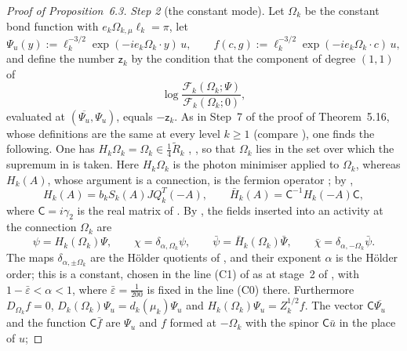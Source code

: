 \documentclass[11pt,letterpaper,reqno]{amsart}
\theoremstyle{definition}
\begin{document}
\begin{proof}[Proof of Proposition~6.3]
\emph{Step 2} (the constant mode).
Let $\Omega_k$ be the constant bond function with $e_k\Omega_{k,\mu}\ell_k=\pi$, let
\begin{equation*}
\Psi_u(y):=\ell_k^{-3/2}\exp(-ie_k\Omega_k\cdot y)\,u,\qquad f(c,g):=\ell_k^{-3/2}\exp(-ie_k\Omega_k\cdot c)\,u,
\end{equation*}
and define the number $\mathsf z_k$ by the condition that the component of degree $(1,1)$ of
\begin{equation*}
\log\frac{\mathscr F_k(\Omega_k;\Psi)}{\mathscr F_k(\Omega_k;0)},
\end{equation*}
evaluated at $(\overline{\Psi_u},\Psi_u)$, equals $-\mathsf z_k$.
As in Step~7 of the proof of Theorem~5.16, whose definitions \cite[(I.O8); Sections~I.3.2, I.3.3, I.3.5]{QEDIII} are the same at every level $k\ge1$ (compare \cite[Proposition~30.3\,(f)]{QEDIII}), one finds the following.
One has $H_k\Omega_k=\Omega_k\in\frac14\tilde R_k$ \cite[Propositions~5.31, 5.38\,(i)]{QEDI}, \cite[Section~I.5.7, paragraph ``Settings'']{QEDIII}, so that $\Omega_k$ lies in the set over which the supremum in \cite[(k6)]{QEDIII} is taken.
Here $H_k\Omega_k$ is the photon minimiser applied to $\Omega_k$, whereas $H_k(A)$, whose argument is a connection, is the fermion operator \cite[Section~I.5.7, first paragraph]{QEDIII};
by \cite[Section~I.3.5]{QEDIII},
\begin{equation*}
H_k(A)=b_kS_k(A)JQ_k^T(-A),\qquad\bar H_k(A)=\mathsf C^{-1}H_k(-A)\mathsf C,
\end{equation*}
where $\mathsf C=i\gamma_2$ is the real matrix of \cite[Section~I.2.1, (I.c3)]{QEDIII}.
By \cite[Section~I.5.4, paragraph ``Fields to be inserted'']{QEDIII}, the fields inserted into an activity at the connection $\Omega_k$ are
\begin{equation*}
\psi=H_k(\Omega_k)\Psi,\qquad\chi=\delta_{\alpha,\Omega_k}\psi,\qquad\bar\psi=\bar H_k(\Omega_k)\bar\Psi,\qquad\bar\chi=\delta_{\alpha,-\Omega_k}\bar\psi .
\end{equation*}
The maps $\delta_{\alpha,\pm\Omega_k}$ are the H\"older quotients of \cite[(I.1.7)]{QEDIII}, and their exponent $\alpha$ is the H\"older order;
this is a constant, chosen in the line (C1) of \cite[Section~I.8.2]{QEDIII} as at stage~2 of \cite[Definition~5.97]{QEDI}, with $1-\bar\varepsilon<\alpha<1$, where $\bar\varepsilon=\frac1{200}$ is fixed in the line (C0) there.
Furthermore $D_{\Omega_k}f=0$, $D_k(\Omega_k)\Psi_u=d_k(\mu_k)\Psi_u$ and $H_k(\Omega_k)\Psi_u=Z_k^{1/2}f$.
The vector $\mathsf C\overline{\Psi_u}$ and the function $\mathsf C\bar f$ are $\Psi_u$ and $f$ formed at $-\Omega_k$ with the spinor $\mathsf C\bar u$ in the place of $u$;

\end{proof}
\end{document}
